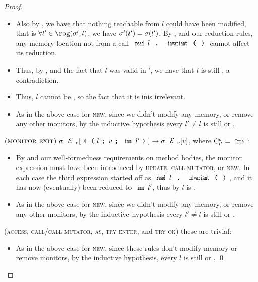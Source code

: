 \begin{proof}
\begin{ienumerate}
\begin{itemize}
		\item Also by , we have that nothing reachable from $l$ could have been modified, that is $\forall l' \in \rog(\s', l)$, we have $\sigma'(l') = \sigma(l')$.
			By , and our reduction rules, any memory location not \reach from a call $\invariant{l}$ cannot affect its reduction.
		\item Thus, by , and the fact that $l$ was valid in \s', we have that $l$ is still \valid, a contradiction.
		\item Thus, $l$ cannot be \reach, so the fact that it is in\valid is irrelevant.
		
		\item As in the above case for \textsc{new}, since we didn't modify any memory, or remove any other monitors, by the inductive hypothesis every $l' \neq l$ is still \valid or \mony.
	\end{itemize}

		
	\item $\rrule{monitor exit}{\s}{\M{l}{v}{\Kw{imm}\,l'}}{\s}{v}$, where $\C{l'} = \Kw{True}$:
	\begin{itemize}
		\item By \VS and our well-formedness requirements on method bodies, the monitor expression must have been introduced by \textsc{update}, \textsc{call mutator}, or \textsc{new}. In each case the third expression started off as $\invariant{l}$, and it has now (eventually) been reduced to $\Kw{imm}\,l'$, thus by  $l$ is \valid.
		
		\item As in the above case for \textsc{new}, since we didn't modify any memory, or remove any other monitors, by the inductive hypothesis every \reach $l' \neq l$ is still \valid or \mony.
	\end{itemize}

	\item (\textsc{access}, \textsc{call/call mutator}, \textsc{as}, \textsc{try enter}, and \textsc{try ok}) these are trivial:
	\begin{itemize}
		\item As in the above case for \textsc{new}, since these rules don't modify memory or remove monitors, by the inductive hypothesis, every \reach $l$ is still \valid or \mony.
	\qed\end{itemize}
\end{ienumerate}
\end{proof}

